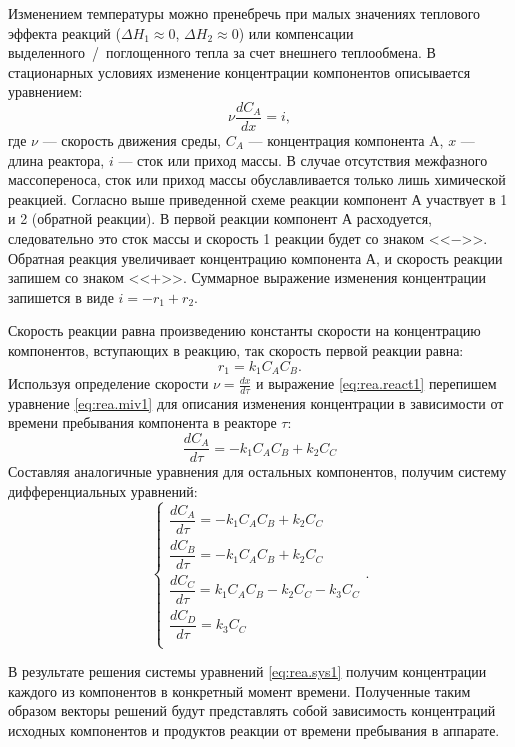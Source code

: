 Изменением температуры можно пренебречь при малых значениях теплового эффекта реакций ($\Delta H_1 \approx 0$, $\Delta H_2 \approx 0$) или компенсации выделенного~/~поглощенного тепла за счет внешнего теплообмена.
В стационарных условиях изменение концентрации компонентов описывается уравнением:
\begin{equation} \label{eq:rea.miv1}
\nu \dfrac{d C_A}{d x} = i,
\end{equation}
где $\nu$ --- скорость движения среды, $C_A$ --- концентрация компонента A, $x$ --- длина реактора, $i$ --- сток или приход массы. В случае отсутствия межфазного массопереноса, сток или приход массы обуславливается только лишь химической реакцией. Согласно выше приведенной схеме реакции компонент А участвует в 1 и 2 (обратной реакции). В первой реакции компонент А расходуется, следовательно это сток массы и скорость 1 реакции будет со знаком <<$-$>>. Обратная реакция увеличивает концентрацию компонента А, и скорость реакции запишем со знаком <<$+$>>. Суммарное выражение изменения концентрации запишется в виде $i=-r_1+r_2$.

Скорость реакции равна произведению константы скорости на концентрацию компонентов, вступающих в реакцию, так скорость первой реакции равна: 
\begin{equation} \label{eq:rea.react1}
r_1=k_1 C_A C_B.
\end{equation}
Используя определение скорости $\nu=\frac{d x}{d \tau}$ и выражение \eqref{eq:rea.react1}
перепишем уравнение \eqref{eq:rea.miv1} для описания изменения концентрации в зависимости от времени пребывания компонента в реакторе $\tau$:
\begin{equation}
\dfrac{d C_A}{d \tau} = -k_1 C_A C_B +k_2 C_C
\end{equation}
Составляя аналогичные уравнения для остальных компонентов, получим систему дифференциальных уравнений:
\begin{equation}\label{eq:rea.sys1}
\left\lbrace 
\begin{gathered} 
\dfrac{d C_A} {d \tau} = -k_1 C_A C_B +k_2 C_C \\
\dfrac{d C_B} {d \tau} = -k_1 C_A C_B +k_2 C_C \\
\dfrac{d C_C} {d \tau} = k_1 C_A C_B -k_2 C_C - k_3 C_C \\
\dfrac{d C_D} {d \tau} = k_3 C_C \\
\end{gathered} 
\right. .
\end{equation}

В результате решения системы уравнений \eqref{eq:rea.sys1} получим концентрации каждого из компонентов в конкретный момент времени. Полученные таким образом векторы решений будут представлять собой зависимость концентраций исходных компонентов и продуктов реакции от времени пребывания в аппарате.

